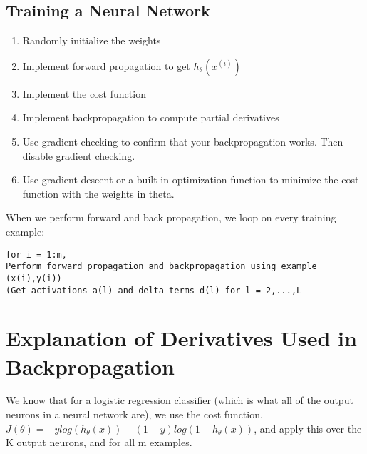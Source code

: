 \subsection{Training a Neural Network}
\begin{enumerate}
	\item Randomly initialize the weights
	\item Implement forward propagation to get $h_\theta(x^{(i)})$
	\item Implement the cost function
	\item Implement backpropagation to compute partial derivatives
	\item Use gradient checking to confirm that your backpropagation works. Then disable gradient checking.
	\item Use gradient descent or a built-in optimization function to minimize the cost function with the weights in theta.
\end{enumerate}
When we perform forward and back propagation, we loop on every training example:
\begin{verbatim}
for i = 1:m,
Perform forward propagation and backpropagation using example (x(i),y(i))
(Get activations a(l) and delta terms d(l) for l = 2,...,L
\end{verbatim}
\section{Explanation of Derivatives Used in Backpropagation}
We know that for a logistic regression classifier (which is what all of the output neurons in a neural network are), we use the cost function, $J(\theta) = -ylog(h_{\theta}(x)) - (1-y)log(1-h_{\theta}(x))$, and apply this over the K output neurons, and for all m examples.

